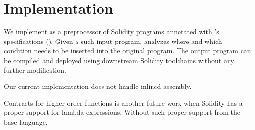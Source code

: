\section{Implementation}

We implement \lang as a preprocessor of Solidity programs annotated with
\lang's specifications (). Given a such input program, \lang analyzes where and
which condition needs to be inserted into the original program.
The output program can be compiled and deployed using downstream Solidity
toolchains without any further modification.

Our current implementation does not handle inlined assembly. 

Contracts for higher-order functions is another future work when Solidity has a
proper support for lambda expressions. Without such proper support from the base language,

